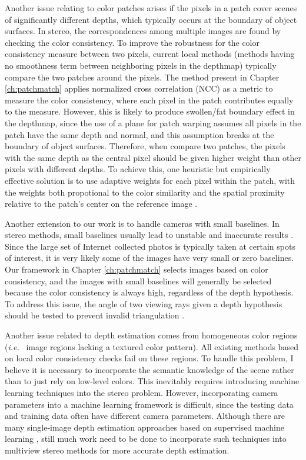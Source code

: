 Another issue relating to color patches arises if the pixels in a patch cover scenes of significantly different depths, which typically occurs at the boundary of object surfaces. 
In stereo, the correspondences among multiple images are found by checking the color consistency.
To improve the robustness for the color consistency measure between two pixels, current local methods (\ie methods having no smoothness term between neighboring pixels in the depthmap) typically compare the two patches around the pixels. The method present in Chapter \ref{ch:patchmatch} applies normalized cross correlation (NCC) as a metric to measure the color consistency, where each pixel in the patch contributes equally to the measure. 
However, this is likely to produce swollen/fat boundary effect in the depthmap, since the use of a plane for patch warping assumes all pixels in the patch have the same depth and normal, and this assumption breaks at the boundary of object surfaces. 
Therefore, when compare two patches, the pixels with the same depth as the central pixel should be given higher weight than other pixels with different depths. To achieve this, one heuristic but empirically effective solution is to use adaptive weights for each pixel within the patch, with the weights both propotional to the color similarity and the spatial proximity relative to the patch's center on the reference image \cite{Yoon06adaptivesupport_weight}. 

Another extension to our work is to handle cameras with small baselines. In stereo methods, small baselines usually lead to unstable and inaccurate results \cite{Hartley2004}. Since the large set of Internet collected photos is typically taken at certain spots of interest, it is very likely some of the images have very small or zero baselines. Our framework in Chapter \ref{ch:patchmatch} selects images based on color consistency, and the images with small baselines will generally be selected because the color consistency is always high, regardless of the depth hypothesis. To address this issue, the angle of two viewing rays given a depth hypothesis should be tested to prevent invalid triangulation \cite{Gallup08}. %

Another issue related to depth estimation comes from homogeneous color regions (\emph{i.e.}~ image regions lacking a textured color pattern).
All existing methods based on local color consistency checks fail on these regions. To handle this problem, I believe it is necessary to incorporate the semantic knowledge of the scene rather than to just rely on low-level colors. This inevitably requires introducing machine learning techniques into the stereo problem. However, incorporating camera parameters into a machine learning framework is difficult, since the testing data and training data often have different camera parameters. Although there are many single-image depth estimation approaches based on supervised machine learning  \cite{Hoiem_CGRAPH2005,Saxena_IJCV2008,eigen2014depth,Liu2014,zhuo2015indoor}, still much work need to be done to incorporate such techniques into multiview stereo methods for more accurate depth estimation.

